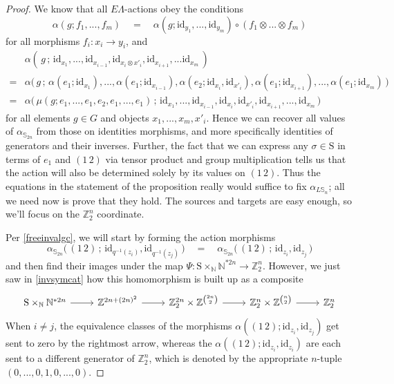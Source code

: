 \documentclass{amsbook} %
\numberwithin{section}{chapter}
\begin{document}
\begin{proof}
We know that all $E\Lambda$-actions obey the conditions
\[ \alpha(g; f_1, ..., f_m) \quad = \quad \alpha(g; \mathrm{id}_{y_1}, ..., \mathrm{id}_{y_m}) \circ (f_1 \otimes ... \otimes f_m) \]
for all morphisms $f_i: x_i \to y_i$, and
\[ \begin{array}{rl}
			& \alpha( \, g \, ; \, \mathrm{id}_{x_1}, ..., \mathrm{id}_{x_{i-1}}, \mathrm{id}_{x_i \otimes x'_{i}}, \mathrm{id}_{x_{i+1}}, ... \mathrm{id}_{x_m} \, ) \\
			= & \alpha\big( \, g \, ; \, \alpha(e_1;\mathrm{id}_{x_1}), ..., \alpha(e_1;\mathrm{id}_{x_{i-1}}), \alpha(e_2;\mathrm{id}_{x_i}, \mathrm{id}_{x'_i}), \alpha(e_1;\mathrm{id}_{x_{i+1}}), ...,  \alpha(e_1;\mathrm{id}_{x_m}) \, \big) \\
			= & \alpha\big( \, \mu(g; e_1, ..., e_1, e_2, e_1, ..., e_1) \, ; \, \mathrm{id}_{x_1}, ..., \mathrm{id}_{x_{i-1}}, \mathrm{id}_{x_i}, \mathrm{id}_{x'_{i}}, \mathrm{id}_{x_{i+1}}, ..., \mathrm{id}_{x_m} \, \big)
		\end{array}
\]
for all elements $g \in G$ and objects $x_1, ..., x_m, x'_i$. Hence we can recover all values of $\alpha_{\mathbb{S}_{2n}}$ from those on identities morphisms, and more specifically identities of generators and their inverses. Further, the fact that we can express any $\sigma \in \mathrm{S}$ in terms of $e_1$ and $(1 \, 2)$ via tensor product and group multiplication tells us that the action will also be determined solely by its values on $(1 \, 2)$. Thus the equations in the statement of the proposition really would suffice to fix $\alpha_{L\mathbb{S}_n}$; all we need now is prove that they hold. The sources and targets are easy enough, so we'll focus on the $\mathbb{Z}_2^{n}$ coordinate.

Per \cref{freeinvalgc}, we will start by forming the action morphisms
\[ \alpha_{\mathbb{S}_{2n}}\big( \, (1 \, 2) \, ; \, \mathrm{id}_{q^{-1}(z_i)}, \mathrm{id}_{q^{-1}(z_j)} \, \big) \quad = \quad \alpha_{\mathbb{S}_{2n}}\big( \, (1 \, 2) \, ; \, \mathrm{id}_{z_i}, \mathrm{id}_{z_j} \, \big) \]
and then find their images under the map $\Psi: \mathrm{S} \times_{\mathbb{N}} \mathbb{N}^{\ast 2n} \to \mathbb{Z}_2^{n}$. However, we just saw in \cref{invsymcat} how this homomorphism is built up as a composite
\[ \begin{tikzcd}
 \mathrm{S} \times_{\mathbb{N}} \mathbb{N}^{\ast 2n} \ar[r] & \mathbb{Z}^{2n + (2n)^2} \ar[r] & \mathbb{Z}_2^{2n} \times \mathbb{Z}^{{2n}\choose{2}} \ar[r] & \mathbb{Z}_2^{n} \times \mathbb{Z}^{{n}\choose{2}}  \ar[r] & \mathbb{Z}_2^{n}
\end{tikzcd} \]
When $i \neq j$, the equivalence classes of the morphisms $\alpha((1 \, 2);\mathrm{id}_{z_i}, \mathrm{id}_{z_j})$ get sent to zero by the rightmost arrow, whereas the $\alpha((1 \, 2);\mathrm{id}_{z_i}, \mathrm{id}_{z_i})$ are each sent to a different generator of $\mathbb{Z}_2^{n}$, which is denoted by the appropriate $n$-tuple $(0,...,0, 1, 0,...,0)$. 


\end{proof}
\end{document}
